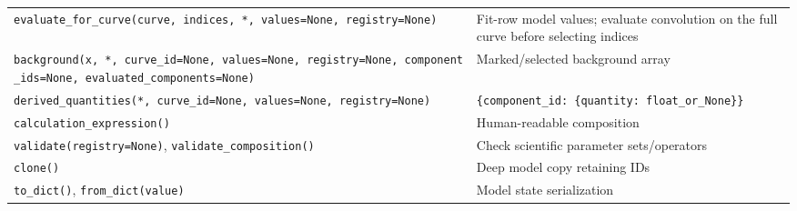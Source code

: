 \documentclass[
  10pt,
  a4paper,
  oneside]{scrreprt}
\begin{document}
\begin{longtable}[]{@{}ll@{}}
\begin{minipage}[t]{0.47\columnwidth}\raggedright
\texttt{evaluate\_for\_curve(curve,\ indices,\ *,\ values=None,\ registry=None)}\strut
\end{minipage} & \begin{minipage}[t]{0.47\columnwidth}\raggedright
Fit-row model values; evaluate convolution on the full curve before
selecting indices\strut
\end{minipage}\tabularnewline
\begin{minipage}[t]{0.47\columnwidth}\raggedright
\texttt{background(x,\ *,\ curve\_id=None,\ values=None,\ registry=None,\ component\_ids=None,\ evaluated\_components=None)}\strut
\end{minipage} & \begin{minipage}[t]{0.47\columnwidth}\raggedright
Marked/selected background array\strut
\end{minipage}\tabularnewline
\begin{minipage}[t]{0.47\columnwidth}\raggedright
\texttt{derived\_quantities(*,\ curve\_id=None,\ values=None,\ registry=None)}\strut
\end{minipage} & \begin{minipage}[t]{0.47\columnwidth}\raggedright
\texttt{\{component\_id:\ \{quantity:\ float\_or\_None\}\}}\strut
\end{minipage}\tabularnewline
\begin{minipage}[t]{0.47\columnwidth}\raggedright
\texttt{calculation\_expression()}\strut
\end{minipage} & \begin{minipage}[t]{0.47\columnwidth}\raggedright
Human-readable composition\strut
\end{minipage}\tabularnewline
\begin{minipage}[t]{0.47\columnwidth}\raggedright
\texttt{validate(registry=None)}, \texttt{validate\_composition()}\strut
\end{minipage} & \begin{minipage}[t]{0.47\columnwidth}\raggedright
Check scientific parameter sets/operators\strut
\end{minipage}\tabularnewline
\begin{minipage}[t]{0.47\columnwidth}\raggedright
\texttt{clone()}\strut
\end{minipage} & \begin{minipage}[t]{0.47\columnwidth}\raggedright
Deep model copy retaining IDs\strut
\end{minipage}\tabularnewline
\begin{minipage}[t]{0.47\columnwidth}\raggedright
\texttt{to\_dict()}, \texttt{from\_dict(value)}\strut
\end{minipage} & \begin{minipage}[t]{0.47\columnwidth}\raggedright
Model state serialization\strut
\end{minipage}\tabularnewline
\bottomrule
\end{longtable}
\end{document}
